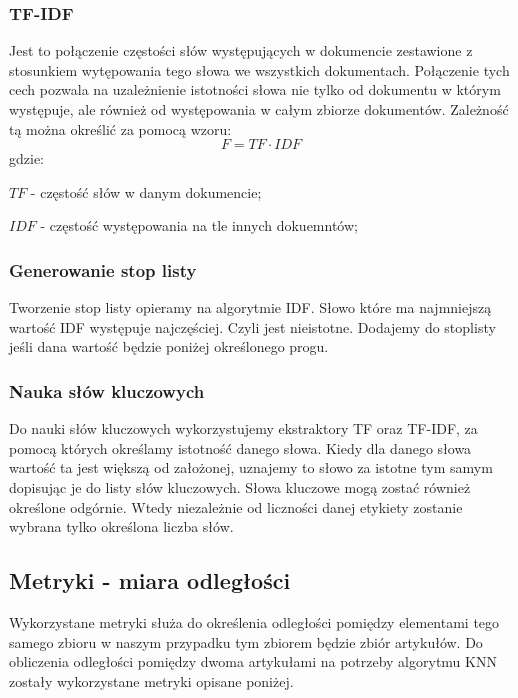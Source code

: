 \documentclass{classrep}
\begin{document}
\subsubsection{TF-IDF}
Jest to połączenie częstości słów występujących w dokumencie zestawione z stosunkiem wytępowania tego słowa we wszystkich
dokumentach. Połączenie tych cech pozwala na uzależnienie istotności słowa nie tylko od dokumentu w którym występuje,
ale również od występowania w całym zbiorze dokumentów. Zależność tą można określić za pomocą wzoru:
\begin{equation}
    F={TF}\cdot{IDF}
\end{equation}
gdzie:\\
\begin{description}
    \item $TF$ - częstość słów w danym dokumencie;
    \item $IDF$ - częstość występowania na tle innych dokuemntów;
\end{description}

\subsubsection{Generowanie stop listy}
Tworzenie stop listy opieramy na algorytmie IDF. Słowo które ma najmniejszą wartość IDF występuje najczęściej. Czyli jest
nieistotne. Dodajemy do stoplisty jeśli dana wartość będzie poniżej określonego progu.

\subsubsection{Nauka słów kluczowych}
Do nauki słów kluczowych wykorzystujemy ekstraktory TF oraz TF-IDF, za pomocą których określamy istotność
danego słowa. Kiedy dla danego słowa wartość ta jest większą od założonej, uznajemy to słowo za istotne tym samym dopisując je do
listy słów kluczowych. Słowa kluczowe mogą zostać również określone odgórnie.
Wtedy niezależnie od liczności danej etykiety zostanie wybrana tylko określona liczba słów.

\subsection{Metryki - miara odległości} \label{wykorzystane_metryki}
Wykorzystane metryki służa do określenia odległości pomiędzy elementami tego samego zbioru w naszym przypadku tym
zbiorem będzie zbiór artykułów. Do obliczenia odległości pomiędzy dwoma artykułami na potrzeby algorytmu KNN zostały
wykorzystane metryki opisane poniżej.
\end{document}

